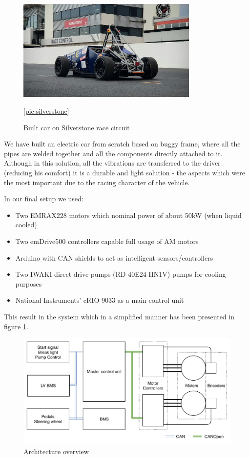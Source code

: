 \begin{figure}[b]
    \centering
        \includegraphics[width=0.8\textwidth]{figures/silverstone.jpg}
        \caption{Built car on Silverstone race circuit}
        \ref{pic:silverstone}
\end{figure}


We have built an electric car from scratch based on buggy frame, where all the pipes are welded together and all the components directly attached to it. Although in this solution, all the vibrations are transferred to the driver (reducing his comfort) it is a durable and light solution - the aspects which were the most important due to the racing character of the vehicle. 

In our final setup we used:
\begin{itemize}
    \item Two EMRAX228 motors which nominal power of about 50kW (when liquid cooled)
    \item Two emDrive500 controllers capable full usage of AM motors
    \item Arduino with CAN shields to act as intelligent sensors/controllers
    \item Two IWAKI direct drive pumps (RD-40E24-HN1V) pumps for cooling purposes
    \item National Instruments' cRIO-9033 as a main control unit
\end{itemize}

This result in the system which in a simplified manner has been presented in figure \ref{fig:whole}.

\begin{figure}[h]
    \centering
    \includegraphics{figures/whole.pdf}
    \caption{Architecture overview}
    \label{fig:whole}
\end{figure}

